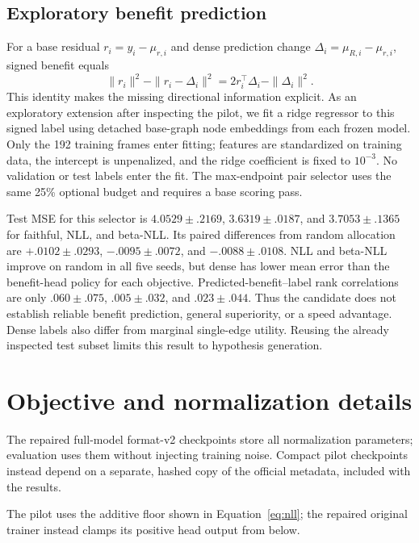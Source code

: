 \subsection{Exploratory benefit prediction}
For a base residual $r_i=y_i-\mu_{r,i}$ and dense prediction change $\Delta_i=\mu_{R,i}-\mu_{r,i}$, signed benefit equals
\begin{equation}
 \|r_i\|^2-\|r_i-\Delta_i\|^2
 =2r_i^\top\Delta_i-\|\Delta_i\|^2.
\end{equation}
This identity makes the missing directional information explicit. As an exploratory extension after inspecting the pilot, we fit a ridge regressor to this signed label using detached base-graph node embeddings from each frozen model. Only the 192 training frames enter fitting; features are standardized on training data, the intercept is unpenalized, and the ridge coefficient is fixed to $10^{-3}$. No validation or test labels enter the fit. The max-endpoint pair selector uses the same 25\% optional budget and requires a base scoring pass.

Test MSE for this selector is $4.0529\pm.2169$, $3.6319\pm.0187$, and $3.7053\pm.1365$ for faithful, NLL, and beta-NLL. Its paired differences from random allocation are $+.0102\pm.0293$, $-.0095\pm.0072$, and $-.0088\pm.0108$. NLL and beta-NLL improve on random in all five seeds, but dense has lower mean error than the benefit-head policy for each objective. Predicted-benefit--label rank correlations are only $.060\pm.075$, $.005\pm.032$, and $.023\pm.044$. Thus the candidate does not establish reliable benefit prediction, general superiority, or a speed advantage. Dense labels also differ from marginal single-edge utility. Reusing the already inspected test subset limits this result to hypothesis generation.




\section{Objective and normalization details}
\label{sec:implementation-details}
The repaired full-model format-v2 checkpoints store all normalization parameters; evaluation uses them without injecting training noise. Compact pilot checkpoints instead depend on a separate, hashed copy of the official metadata, included with the results.

The pilot uses the additive floor shown in Equation~\ref{eq:nll}; the repaired original trainer instead clamps its positive head output from below.

